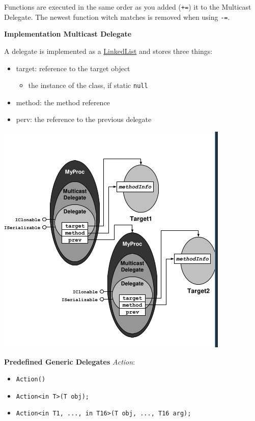 \documentclass[11pt,twoside,landscape]{article}
\begin{document}
\begin{multicols}{3}
Functions are executed in the same order as you added (\texttt{+=}) it to the Multicast Delegate.
The newest function witch matches is removed when using \texttt{-=}.

\textbf{Implementation Multicast Delegate}

A delegate is implemented as a \href{../../../roam/20210806213600-linkedlist.org}{LinkedList} and stores three things:
\begin{itemize}
\item target: reference to the target object
\begin{itemize}
\item the instance of the class, if static \texttt{null}
\end{itemize}
\item method: the method reference
\item perv: the reference to the previous delegate
\end{itemize}


\begin{center}
\includegraphics[width=.9\linewidth]{img/multicast_delegate_implementation.png}
\label{org4a38fbb}
\end{center}


\textbf{Predefined Generic Delegates}
\emph{Action}:
\begin{itemize}
\item \texttt{Action()}
\item \texttt{Action<in T>(T obj);}
\item \texttt{Action<in T1, ..., in T16>(T obj, ..., T16 arg);}
\end{itemize}


\end{multicols}
\end{document}
